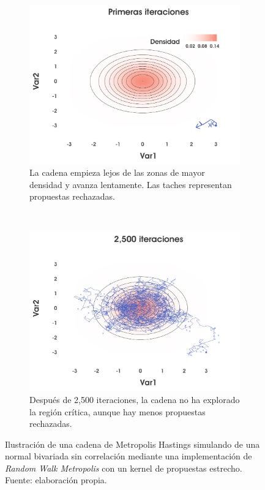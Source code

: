 \begin{figure}[H]
    \centering
    \begin{subfigure}{0.35\textwidth}
        \includegraphics[width=\textwidth]{Figs/Bayes/Ejemplo2_RWM_A}
        \caption{La cadena empieza lejos de las zonas de mayor densidad y avanza lentamente. Las taches representan propuestas rechazadas.}
    \end{subfigure}
    ~ 
    \begin{subfigure}{0.35\textwidth}
        \includegraphics[width=\textwidth]{Figs/Bayes/Ejemplo2_RWM_B}
        \caption{Después de 2,500 iteraciones, la cadena no ha explorado la región crítica, aunque hay menos propuestas rechazadas.}
    \end{subfigure}
    \caption{Ilustración de una cadena de Metropolis Hastings simulando de una normal bivariada sin correlación mediante una implementación de \textit{Random Walk Metropolis} con un kernel de propuestas estrecho. Fuente: elaboración propia.}\label{fig:RWM2}
\end{figure}

